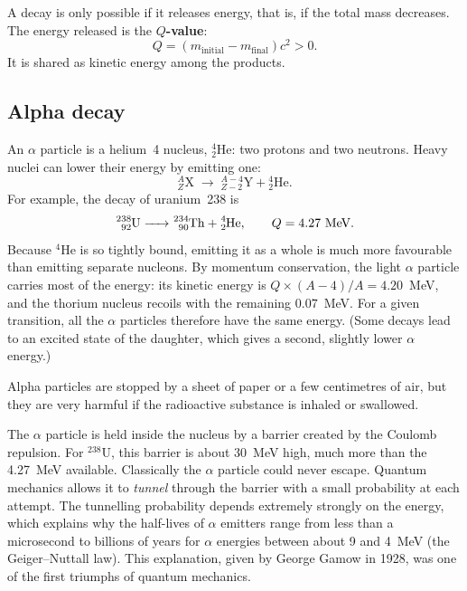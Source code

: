 \documentclass[11pt,a4paper]{article}
\newcommand{\nuc}[3]{\ensuremath{{}^{#1}_{#2}\mathrm{#3}}}   %
\newcommand{\iso}[2]{\ensuremath{{}^{#1}\mathrm{#2}}}         %
\begin{document}
A decay is only possible if it releases energy, that is, if the total mass decreases. The energy released is the \textbf{$Q$-value}:
\begin{equation}
  Q = \left( m_{\text{initial}} - m_{\text{final}} \right) c^2 > 0 .
  \label{eq:Q}
\end{equation}
It is shared as kinetic energy among the products.

\subsection{Alpha decay}

An $\alpha$ particle is a helium~4 nucleus, \nuc{4}{2}{He}: two protons and two neutrons. Heavy nuclei can lower their energy by emitting one:
\[
\nuc{A}{Z}{X} \;\longrightarrow\; \nuc{A-4}{Z-2}{Y} + \nuc{4}{2}{He}.
\]
For example, the decay of uranium~238 is
\[
\ce{^{238}_{92}U -> ^{234}_{90}Th + ^{4}_{2}He}, \qquad Q = 4.27~\text{MeV}.
\]
Because \iso{4}{He} is so tightly bound, emitting it as a whole is much more favourable than emitting separate nucleons. By momentum conservation, the light $\alpha$ particle carries most of the energy: its kinetic energy is $Q \times (A-4)/A = 4.20$~MeV, and the thorium nucleus recoils with the remaining $0.07$~MeV. For a given transition, all the $\alpha$ particles therefore have the same energy. (Some decays lead to an excited state of the daughter, which gives a second, slightly lower $\alpha$ energy.)

Alpha particles are stopped by a sheet of paper or a few centimetres of air, but they are very harmful if the radioactive substance is inhaled or swallowed.

\begin{furtherbox}
The $\alpha$ particle is held inside the nucleus by a barrier created by the Coulomb repulsion. For \iso{238}{U}, this barrier is about 30~MeV high, much more than the 4.27~MeV available. Classically the $\alpha$ particle could never escape. Quantum mechanics allows it to \emph{tunnel} through the barrier with a small probability at each attempt. The tunnelling probability depends extremely strongly on the energy, which explains why the half-lives of $\alpha$ emitters range from less than a microsecond to billions of years for $\alpha$ energies between about 9 and 4~MeV (the Geiger--Nuttall law). This explanation, given by George Gamow in 1928, was one of the first triumphs of quantum mechanics.
\end{furtherbox}
\end{document}
